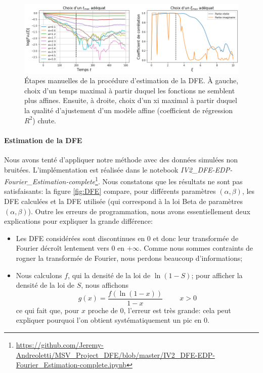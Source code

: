 \documentclass[12pt]{article}
\newcommand{\esp}{\hspace{1cm}}
\begin{document}
\begin{figure}[h]
  \begin{center}
    \includegraphics[width=0.9\linewidth]{../Img/DFE_choix_tmax_xi.png}
  \end{center}
  \caption{\label{fig:DFE_choix}Étapes manuelles de la procédure d'estimation de la DFE. À gauche, choix d'un temps maximal à partir duquel les fonctions ne semblent plus affines. Ensuite, à droite, choix d'un xi maximal à partir duquel la qualité d'ajustement d'un modèle affine (coefficient de régression $R^2$) chute.}
\end{figure}


\paragraph{Estimation de la DFE}

Nous avons tenté d'appliquer notre méthode avec des données simulées non bruitées. L'implémentation est réalisée dans le notebook \emph{IV2\_DFE-EDP-Fourier\_Estimation-complete}\footnote{\url{https://github.com/Jeremy-Andreoletti/MSV_Project_DFE/blob/master/IV2_DFE-EDP-Fourier_Estimation-complete.ipynb}}. Nous constatons que les résultats ne sont pas satisfaisants: la figure \ref{fig:DFE} compare, pour différents paramètres $(\alpha,\beta)$, les DFE calculées et la DFE utilisée (qui correspond à la loi Beta de paramètres $(\alpha,\beta)$). Outre les erreurs de programmation, nous avons essentiellement deux explications pour expliquer la grande différence:
\begin{itemize}
\item Les DFE considérées sont discontinues en 0 et donc leur transformée de Fourier décroît lentement vers 0 en $+\infty$. Comme nous sommes contraints de rogner la transformée de Fourier, nous perdons beaucoup d'informations;
\item Nous calculons $f$, qui la densité de la loi de $\ln(1-S)$; pour afficher la densité de la loi de $S$, nous affichons \[g(x)=\frac{f(\ln (1-x))}{1-x}\esp x>0\] ce qui fait que, pour $x$ proche de $0$, l'erreur est très grande: cela peut expliquer pourquoi l'on obtient systématiquement un pic en 0.
\end{itemize}
\end{document}
